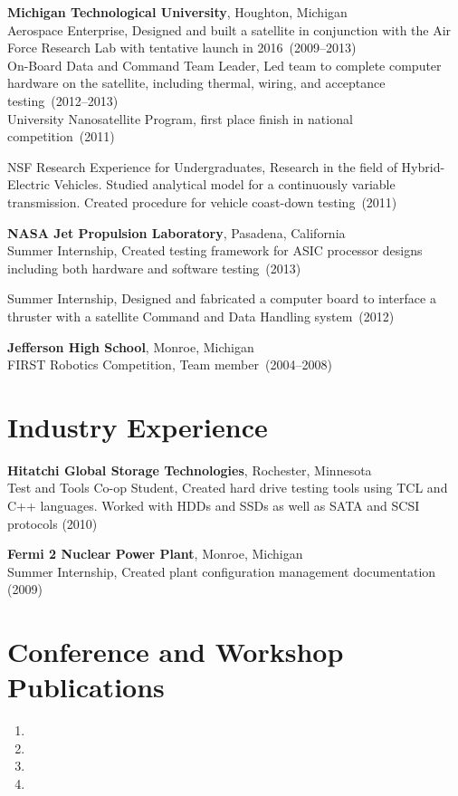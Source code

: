 \documentclass{article}
\begin{document}
{\bf Michigan Technological University}, Houghton, Michigan \\
Aerospace Enterprise, Designed and built a satellite in conjunction with the
Air Force Research Lab with tentative launch in 2016~(2009--2013) \\
On-Board Data and Command Team Leader, Led team to complete computer hardware
on the satellite, including thermal, wiring, and acceptance testing~(2012--2013) \\
University Nanosatellite Program, first place finish in national competition~(2011)

NSF Research Experience for Undergraduates, Research in the field of
Hybrid-Electric Vehicles. Studied analytical model for a continuously variable
transmission. Created procedure for vehicle coast-down testing~(2011)


{\bf NASA Jet Propulsion Laboratory}, Pasadena, California \\
Summer Internship, Created testing framework for ASIC processor designs
including both hardware and software testing~(2013)

Summer Internship, Designed and fabricated a computer board to interface a
thruster with a satellite Command and Data Handling system~(2012)

{\bf Jefferson High School}, Monroe, Michigan \\
FIRST Robotics Competition, Team member~(2004--2008)


\section*{Industry Experience}
\vspace{-6pt}

{\bf Hitatchi Global Storage Technologies}, Rochester, Minnesota \\
Test and Tools Co-op Student, Created hard drive testing tools using TCL and
C++ languages. Worked with HDDs and SSDs as well as SATA and SCSI protocols (2010)

{\bf Fermi 2 Nuclear Power Plant}, Monroe, Michigan \\
Summer Internship, Created plant configuration management documentation (2009)


\section*{Conference and Workshop Publications}
\begin{enumerate}
  \item {}
  \item {}
  \item {}
  \item {}
\end{enumerate}
\end{document}
